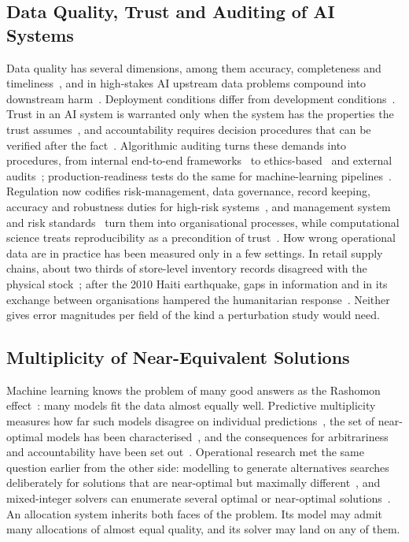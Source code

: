 \documentclass[systems,article,accept,moreauthors,pdftex]{Definitions/mdpi}
\begin{document}
\subsection{Data Quality, Trust and Auditing of AI Systems}
Data quality has several dimensions, among them accuracy, completeness and
timeliness~\cite{wang1996dataquality}, and in high-stakes AI upstream data problems
compound into downstream harm~\cite{sambasivan2021cascades}. Deployment conditions differ
from development conditions~\cite{quinonerocandela2008shift,amodei2016concrete}.
Trust in an AI system is warranted only when the system has the properties the trust
assumes~\cite{jacovi2021trust}, and accountability requires decision procedures that can
be verified after the fact~\cite{kroll2017accountable,doshivelez2017interpretable}.
Algorithmic auditing turns these demands into procedures, from internal end-to-end
frameworks~\cite{raji2020audit} to ethics-based~\cite{mokander2021ethics} and external
audits~\cite{metaxa2021auditing}; production-readiness tests do the same for machine-learning
pipelines~\cite{breck2017mltestscore}. Regulation now codifies risk-management, data governance,
record keeping, accuracy and robustness duties for high-risk systems~\cite{eu2024aiact}, and
management system and risk standards~\cite{iso2023aims,iso2023airisk,nist2023airmf} turn them
into organisational processes, while computational science treats reproducibility as a
precondition of trust~\cite{peng2011reproducible,stodden2016enhancing,gundersen2018reproducibility,pineau2021reproducibility,wilkinson2016fair}.
How wrong operational data are in practice has been measured only in a few settings. In
retail supply chains, about two thirds of store-level inventory records disagreed with the
physical stock~\cite{dehoratius2008inventory}; after the 2010 Haiti earthquake, gaps in
information and in its exchange between organisations hampered the humanitarian
response~\cite{altay2014haiti}. Neither gives error magnitudes per field of the kind a
perturbation study would need.

\subsection{Multiplicity of Near-Equivalent Solutions}
Machine learning knows the problem of many good answers as the Rashomon
\linebreak  effect~\cite{breiman2001twocultures}: many models fit the data almost equally well. Predictive
multiplicity measures how far such models disagree on individual
predictions~\cite{marx2020multiplicity}, the set of near-optimal models has been
characterised~\cite{semenova2022rashomon,fisher2019allmodels}, and the consequences for
arbitrariness and accountability have been set out~\cite{black2022multiplicity}. Operational
research met the same question earlier from the other side: modelling to generate
alternatives searches deliberately for solutions that are near-optimal but maximally
different~\cite{brill1979public,brill1982mga}, and mixed-integer solvers can enumerate several
optimal or near-optimal solutions~\cite{danna2007multiple}. An allocation system inherits both
faces of the problem. Its model may admit many allocations of almost equal quality, and its
solver may land on any of them.
\end{document}
